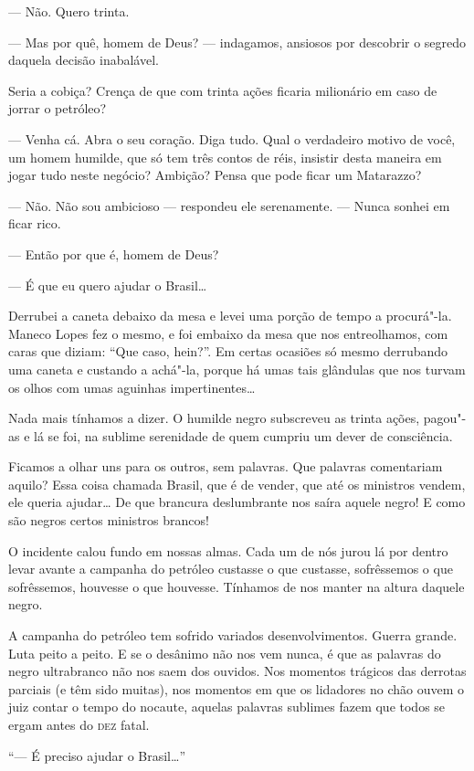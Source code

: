 --- Não. Quero trinta.

--- Mas por quê, homem de Deus? --- indagamos, ansiosos por descobrir o
segredo daquela decisão inabalável.

Seria a cobiça? Crença de que com trinta ações ficaria milionário em
caso de jorrar o petróleo?

--- Venha cá. Abra o seu coração. Diga tudo. Qual o verdadeiro motivo de
você, um homem humilde, que só tem três contos de réis, insistir desta
maneira em jogar tudo neste negócio? Ambição? Pensa que pode ficar um
Matarazzo?

--- Não. Não sou ambicioso --- respondeu ele serenamente. --- Nunca
sonhei em ficar rico.

--- Então por que é, homem de Deus?

--- É que eu quero ajudar o Brasil\ldots{}

Derrubei a caneta debaixo da mesa e levei uma porção de tempo a
procurá"-la. Maneco Lopes fez o mesmo, e foi embaixo da mesa que nos
entreolhamos, com caras que diziam: ``Que caso, hein?''. Em certas
ocasiões só mesmo derrubando uma caneta e custando a achá"-la, porque há
umas tais glândulas que nos turvam os olhos com umas aguinhas
impertinentes\ldots{}

Nada mais tínhamos a dizer. O humilde negro subscreveu as trinta ações,
pagou"-as e lá se foi, na sublime serenidade de quem cumpriu um dever de
consciência.

Ficamos a olhar uns para os outros, sem palavras. Que palavras
comentariam aquilo? Essa coisa chamada Brasil, que é de vender, que até
os ministros vendem, ele queria ajudar\ldots{} De que brancura deslumbrante
nos saíra aquele negro! E como são negros certos ministros brancos!

O incidente calou fundo em nossas almas. Cada um de nós jurou lá por
dentro levar avante a campanha do petróleo custasse o que custasse,
sofrêssemos o que sofrêssemos, houvesse o que houvesse. Tínhamos de nos
manter na altura daquele negro.

A campanha do petróleo tem sofrido variados desenvolvimentos. Guerra
grande. Luta peito a peito. E se o desânimo não nos vem nunca, é que as
palavras do negro ultrabranco não nos saem dos ouvidos. Nos momentos
trágicos das derrotas parciais (e têm sido muitas), nos momentos em que
os lidadores no chão ouvem o juiz contar o tempo do nocaute, aquelas
palavras sublimes fazem que todos se ergam antes do \textsc{dez} fatal.

``--- É preciso ajudar o Brasil\ldots{}''


